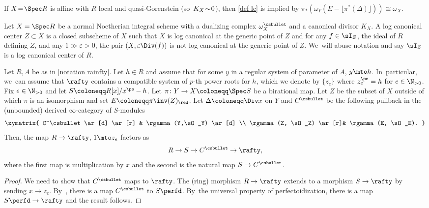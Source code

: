 \begin{remark}
If $X\!=\!\Spec R$ is affine with $R$ local and quasi-Gorenstein (so~$K_X\!\sim\! \nobreak0$), then \autoref{def lc} is implied by $\pi_*(\omega_Y(E- \lfloor \pi^*(\Delta) \rfloor))\cong \omega_X$.
\end{remark}

\begin{definition}
Let $X=\Spec R$ be a normal Noetherian integral scheme with a dualizing complex $\omega^\csbullet_X$ and a canonical divisor $K_X$. A log canonical center $Z\subset X$ is a closed subscheme of $X$ such that $X$ is log canonical at the generic point of $Z$ and for any $f\in \sI_Z$, the ideal of $R$ defining $Z$, and any $1\gg\varepsilon>0$, the pair $(X,\varepsilon \Div(f))$ is not log canonical at the generic point of $Z$. We~will abuse notation and say $\sI_Z$ is a log canonical center of $R$.
\end{definition}

\begin{lemma}\label{map to c bullet is pure}
Let $R, A$ be as in \autoref{notation rainfty}. Let $h\in R$ and assume that for some $y$ in a regular system of parameter of $A$, $y\mto h$. In~particular, we~can assume that $\rafty$ contains a compatible system of $p$-th power roots for $h$, which we denote by $\{z_e\}$ where $z_e^\pe=h$ for $e\in \N_{>0}$. Fix $e\in \N_{>0}$ and let $S\coloneqq R[x]/x^\pe-h$.
Let $\pi\colon Y\to X\coloneqq\Spec S$ be a birational map. Let $Z$ be the subset of $X$ outside of which $\pi$ is an isomorphism and set $E\coloneqq \pi\inv(Z)_{\red}$. Let $\Delta\coloneqq \Div x$ on $Y$ and $C^\csbullet$ be the following pullback in the (unbounded) derived $\infty$-category of $S$-modules
\[
\xymatrix{
C^\csbullet \ar[d] \ar[r] & \rgamma(Y,\sO_Y) \ar[d] \\
\rgamma(Z, \sO_Z) \ar[r]& \rgamma(E, \sO_E).
}
\]
Then, the map $R\to \rafty$, $1\mto z_e$ factors as
\[
R\to S \to C^\csbullet \to \rafty,
\]
where the first map is multiplication by $x$ and the second is the natural map $S\to C^\csbullet$.
\end{lemma}

\begin{proof}
We need to show that $C^\csbullet$ maps to $\rafty$. The (ring) morphism $R\to \rafty$ extends to a morphism $S\to \rafty$ by sending $x\to z_e$. By~\cite[Lem.\,5.3]{BMPSTWWPerfectoidPure}, there is a map $C^\csbullet$ to $S\perfd$. By~the universal property of perfectoidization, there is a map $S\perfd\to \rafty$ and the result follows.
\end{proof}

